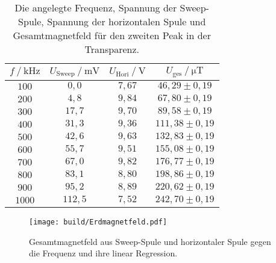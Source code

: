 \begin{table}[H]
    \centering
    \caption{Die angelegte Frequenz, Spannung der Sweep-Spule, Spannung der horizontalen Spule und Gesamtmagnetfeld für den zweiten Peak in der Transparenz.}
    \label{tab:Messung2}
    \begin{tabular}{S S S S}
    \toprule
      $ f \mathbin{/} \unit{\kilo\hertz}$ & $U_{\text{Sweep}} \mathbin{/} \unit{\milli\volt}$ & $U_{\text{Hori}} \mathbin{/} \unit{\volt}$ & $U_{\text{ges}} \mathbin{/} \unit{\micro\tesla}$ \\
    \midrule
    $100$ &     $ 0,0    $    &   $7,67$     &$46,29   \pm 0,19$     \\ 
    $200$ &     $ 4,8  $    &   $9,84$     &$67,80   \pm 0,19$     \\ 
    $300$ &     $ 17,7 $    &   $9,70$     &$89,58   \pm 0,19$    \\ 
    $400$ &     $ 31,3 $    &   $9,36$     &$111,38  \pm 0,19$    \\ 
    $500$ &     $ 42,6 $    &   $9,63$     &$132,83  \pm 0,19$    \\ 
    $600$ &     $ 55,7 $    &   $9,51$     &$155,08  \pm 0,19$    \\ 
    $700$ &     $ 67,0 $    &   $9,82$     &$176,77  \pm 0,19$    \\ 
    $800$ &     $ 83,1 $    &   $8,80$     &$198,86  \pm 0,19$    \\ 
    $900$ &     $ 95,2 $    &   $8,89$     &$220,62  \pm 0,19$    \\ 
    $1000$ &    $ 112,5$    &   $7,52$     &$242,70  \pm 0,19$    \\ 

    \bottomrule
    \end{tabular}
    \end{table}


\begin{figure}[H]
    \centering
    \texttt{[image: build/Erdmagnetfeld.pdf]}
    \caption{Gesamtmagnetfeld aus Sweep-Spule und horizontaler Spule gegen die Frequenz und ihre linear Regression.}
    \label{fig:Gesamtmagnetfeld}
\end{figure}


 
 
 
 
 
 
 
 
 
 













